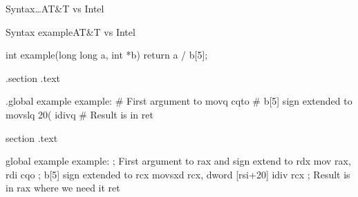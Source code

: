 \begin{slide}{Syntax\dots}{AT&T vs Intel}
  \begin{nicscolumn*}{0.7cm}{1.5cm}{7cm}
  \end{nicscolumn*}
  \begin{nicscolumn*}{8.3cm}{1.5cm}{7.5cm}
    \nicspar{}
  \end{nicscolumn*}
\end{slide}

\begin{slide}{Syntax example}{AT&T vs Intel}
  \begin{nicscolumn*}{4cm}{1.5cm}{8cm}
    \begin{nicsextern}[width=5cm]{}
      int example(long long a, int *b) {
        return a / b[5];
      }
    \end{nicsextern}
  \end{nicscolumn*}
  \begin{nicscolumn*}{0.7cm}{3cm}{7cm}
    \begin{nicsextern}[height=3.7cm]{}
      .section .text

      .global example
      example:
        # First argument to %
        movq    %
        cqto
        # b[5] sign extended to %
        movslq  20(%
        idivq   %
        # Result is in %
        ret
    \end{nicsextern}
  \end{nicscolumn*}
  \begin{nicscolumn*}{8.3cm}{3cm}{7.5cm}
    \begin{nicsextern}[height=3.7cm]{}
      section .text

      global example
      example:
        ; First argument to rax and sign extend to rdx
        mov    rax, rdi
        cqo
        ; b[5] sign extended to rcx
        movsxd rcx, dword [rsi+20]
        idiv   rcx
        ; Result is in rax where we need it
        ret
    \end{nicsextern}
  \end{nicscolumn*}
\end{slide}

